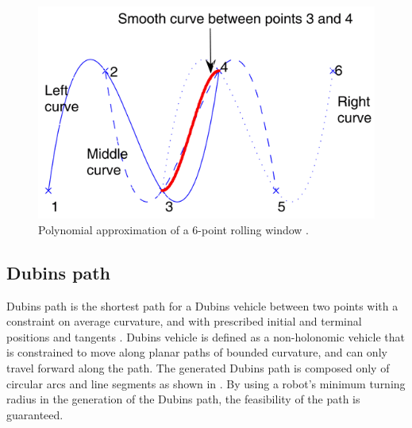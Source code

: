 \begin{figure}[h!]
    \centering
	\includegraphics[width=0.5\linewidth]{fig/lit_rev/poly_approx}
	\caption[Polynomial approximation of a 6-point rolling window.]{Polynomial approximation of a 6-point rolling window \citep{guo2006complete}.}
	\label{fig:poly_approx}
\end{figure}

\subsection{Dubins path}

Dubins path is the shortest path for a Dubins vehicle between two points with a constraint on average curvature, and with prescribed initial and terminal positions and tangents \citep{dubins1957curves}. Dubins vehicle is defined as a non-holonomic vehicle that is constrained to move along planar paths of bounded curvature, and can only travel forward along the path. The generated Dubins path is composed only of circular arcs and line segments as shown in . By using a robot's minimum turning radius in the generation of the Dubins path, the feasibility of the path is guaranteed.

